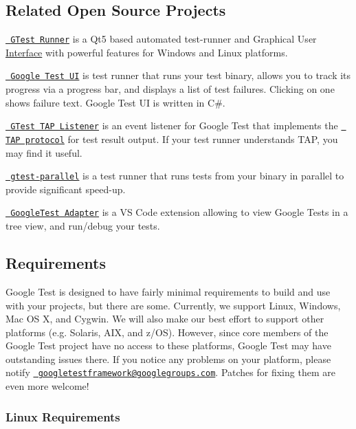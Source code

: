 \subsection*{Related Open Source Projects}

\href{https://github.com/nholthaus/gtest-runner}{\texttt{ G\+Test Runner}} is a Qt5 based automated test-\/runner and Graphical User \mbox{\hyperlink{classInterface}{Interface}} with powerful features for Windows and Linux platforms.

\href{https://github.com/ospector/gtest-gbar}{\texttt{ Google Test UI}} is test runner that runs your test binary, allows you to track its progress via a progress bar, and displays a list of test failures. Clicking on one shows failure text. Google Test UI is written in C\#.

\href{https://github.com/kinow/gtest-tap-listener}{\texttt{ G\+Test T\+AP Listener}} is an event listener for Google Test that implements the \href{https://en.wikipedia.org/wiki/Test_Anything_Protocol}{\texttt{ T\+AP protocol}} for test result output. If your test runner understands T\+AP, you may find it useful.

\href{https://github.com/google/gtest-parallel}{\texttt{ gtest-\/parallel}} is a test runner that runs tests from your binary in parallel to provide significant speed-\/up.

\href{https://marketplace.visualstudio.com/items?itemName=DavidSchuldenfrei.gtest-adapter}{\texttt{ Google\+Test Adapter}} is a VS Code extension allowing to view Google Tests in a tree view, and run/debug your tests.

\subsection*{Requirements}

Google Test is designed to have fairly minimal requirements to build and use with your projects, but there are some. Currently, we support Linux, Windows, Mac OS X, and Cygwin. We will also make our best effort to support other platforms (e.\+g. Solaris, A\+IX, and z/\+OS). However, since core members of the Google Test project have no access to these platforms, Google Test may have outstanding issues there. If you notice any problems on your platform, please notify \href{https://groups.google.com/forum/\#!forum/googletestframework}{\texttt{ googletestframework@googlegroups.\+com}}. Patches for fixing them are even more welcome!

\subsubsection*{Linux Requirements}

